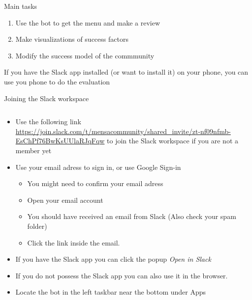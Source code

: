 \begin{frame}{Main tasks}
  \begin{enumerate}
    \item Use the bot to get the menu and make a review
    \item Make visualizations of success factors
    \item Modify the success model of the commmunity
  \end{enumerate}
  
If you have the Slack app  installed (or want to install it) on your phone, you can use you phone to do the evaluation
    

\end{frame}


\begin{frame}{Joining the Slack workspace}
  \begin{columns}
    \begin{column}[]{0.7\textwidth}
      \begin{itemize}
        \item Use the following link \\
         \url{https://join.slack.com/t/mensacommunity/shared_invite/zt-nf09nfmb-EsChPf76BwKsUUlaRJqFqw} to join the Slack workspace if you are not a member yet
        \item Use your email adress to sign in, or use Google Sign-in
         \begin{itemize}
          \item You might need to confirm your email adress
          \item Open your email account
          \item You should have received an email from Slack (Also check your spam folder)
          \item  Click the link inside the email. 
        \end{itemize}
       \item If you have the Slack app you can click the popup \emph{Open in Slack}
        \item If you do not possess the Slack app you can also use it in the browser.
        \item  Locate the bot in the left taskbar near the bottom under Apps
      \end{itemize}


\end{column}
\end{columns}
\end{frame}
